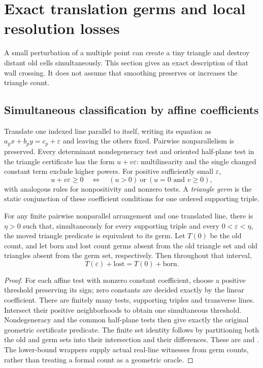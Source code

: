 \section{Exact translation germs and local resolution losses}
\label{sec:surgery}

A small perturbation of a multiple point can create a tiny triangle and
destroy distant old cells simultaneously. This section gives an exact
description of that wall crossing. It does not assume that smoothing
preserves or increases the triangle count.

\subsection{Simultaneous classification by affine coefficients}

Translate one indexed line parallel to itself, writing its equation as
$a_px+b_py=c_p+\varepsilon$ and leaving the others fixed. Pairwise
nonparallelism is preserved. Every determinant nondegeneracy test and
oriented half-plane test in the triangle certificate has the form
$u+v\varepsilon$: multilinearity and the single changed constant term
exclude higher powers. For positive sufficiently small $\varepsilon$,
\[
 u+v\varepsilon\ge0\quad\Longleftrightarrow\quad
 (u>0)\ \text{or}\ (u=0\text{ and }v\ge0),
\]
with analogous rules for nonpositivity and nonzero tests. A
\emph{triangle germ} is the static conjunction of these coefficient
conditions for one ordered supporting triple.

\begin{theorem}\label{surgery:germs}
For any finite pairwise nonparallel arrangement and one translated line,
there is $\eta>0$ such that, simultaneously for every supporting triple
and every $0<\varepsilon<\eta$, the moved triangle predicate is equivalent
to its germ. Let $T(0)$ be the old count, and let $\mathrm{born}$ and
$\mathrm{lost}$ count germs absent from the old triangle set and old
triangles absent from the germ set, respectively. Then throughout that
interval,
\begin{equation}
 T(\varepsilon)+\mathrm{lost}=T(0)+\mathrm{born}.
 \label{surgery:birth-loss}
\end{equation}
\end{theorem}
\begin{proof}
For each affine test with nonzero constant coefficient, choose a positive
threshold preserving its sign; zero constants are decided exactly by the
linear coefficient. There are finitely many tests, supporting triples
and transverse lines. Intersect their positive neighborhoods to obtain
one simultaneous threshold. Nondegeneracy and the common half-plane
tests then give exactly the original geometric certificate predicate.
The finite set identity follows by partitioning both the old and germ
sets into their intersection and their differences. These are
and .
The lower-bound wrappers supply actual real-line witnesses from germ
counts, rather than treating a formal count as a geometric oracle.
\end{proof}

